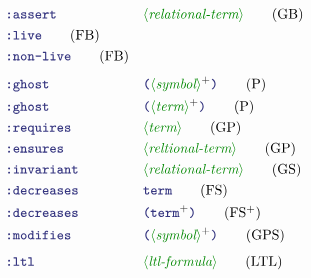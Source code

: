 \documentclass[runningheads]{llncs}
\begin{document}
\begin{align}
& \terminal{:assert}
    && \nonterminal{relational-term}
    \tag{GB} \\
& \terminal{:live}
    \tag{FB} \\
& \terminal{:non-live}
    \tag{FB} \\[4pt]
& \terminal{:ghost}
    && \LP \nonterminal{symbol}\rplus \RP
    \tag{P} \\
& \terminal{:ghost}
    && \LP \nonterminal{term}\rplus \RP
    \tag{P} \\
& \terminal{:requires}
    && \nonterminal{term}
    \tag{GP} \\
& \terminal{:ensures}
    && \nonterminal{reltional-term}
    \tag{GP} \\
& \terminal{:invariant}
    && \nonterminal{relational-term}
    \tag{GS} \\
& \terminal{:decreases}
    && \terminal{term}
    \tag{FS} \\
& \terminal{:decreases}
    && \LP \terminal{term}\rplus \RP
    \tag{FS$^+$} \\
& \terminal{:modifies}
    && \LP \nonterminal{symbol}\rplus \RP
    \tag{GPS} \\[4pt]
& \terminal{:ltl}
    && \nonterminal{ltl-formula}
    \tag{LTL}
\end{align}
\end{document}
